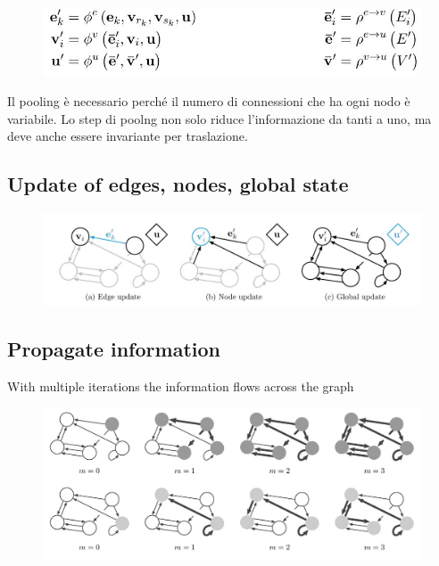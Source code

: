 \begin{figure}[ht]
	\centering
	\includegraphics[width=0.8\linewidth]{figure_ml/repr.png}
\end{figure}
\FloatBarrier
Il pooling è necessario perché il numero di connessioni che ha ogni nodo è variabile. Lo step di poolng non solo riduce l'informazione da tanti a uno, ma deve anche essere invariante per traslazione.

\subsection{Update of edges, nodes, global state}

\begin{figure}[ht]
	\centering
	\includegraphics[width=1\linewidth]{figure_ml/ang}
\end{figure}
\FloatBarrier
\subsection{Propagate information}

With multiple iterations the information flows across the graph

\begin{figure}[ht]
	\centering
	\includegraphics[width=1\linewidth]{figure_ml/propagate}
\end{figure}
\FloatBarrier

